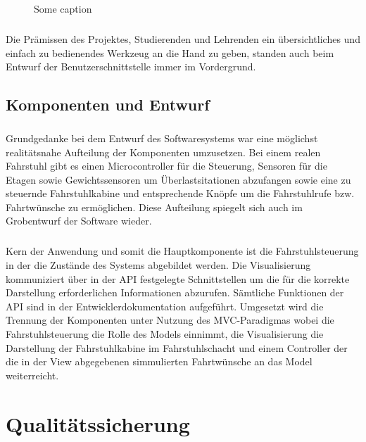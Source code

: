 \begin{figure}[h]
	\centering
	\caption{Some caption}
	\label{UI_final}
\end{figure}

\paragraph{}Die Prämissen des Projektes, Studierenden und Lehrenden ein übersichtliches und einfach zu bedienendes Werkzeug an die Hand zu geben, standen auch beim Entwurf der Benutzerschnittstelle immer im Vordergrund.

\section{Komponenten und Entwurf}
\paragraph{}Grundgedanke bei dem Entwurf des Softwaresystems war eine möglichst realitätsnahe Aufteilung der Komponenten umzusetzen. Bei einem realen Fahrstuhl gibt es einen Microcontroller für die Steuerung, Sensoren für die Etagen sowie Gewichtssensoren um Überlastsitationen abzufangen sowie eine zu steuernde Fahrstuhlkabine und entsprechende Knöpfe um die Fahrstuhlrufe bzw. Fahrtwünsche zu ermöglichen. Diese Aufteilung spiegelt sich auch im Grobentwurf der Software wieder.
\paragraph{} Kern der Anwendung und somit die Hauptkomponente ist die Fahrstuhlsteuerung in der die Zustände des Systems abgebildet werden. Die Visualisierung kommuniziert über in der \acrshort{API} festgelegte Schnittstellen um die für die korrekte Darstellung erforderlichen Informationen abzurufen. Sämtliche Funktionen der \acrshort{API} sind in der Entwicklerdokumentation aufgeführt.
Umgesetzt wird die Trennung der Komponenten unter Nutzung des MVC-Paradigmas wobei die Fahrstuhlsteuerung die Rolle des Models einnimmt, die Visualisierung die Darstellung der Fahrstuhlkabine im Fahrstuhlschacht und einem Controller der die in der View abgegebenen simmulierten Fahrtwünsche an das Model weiterreicht.
\chapter{Qualitätssicherung}
\label{QS}
